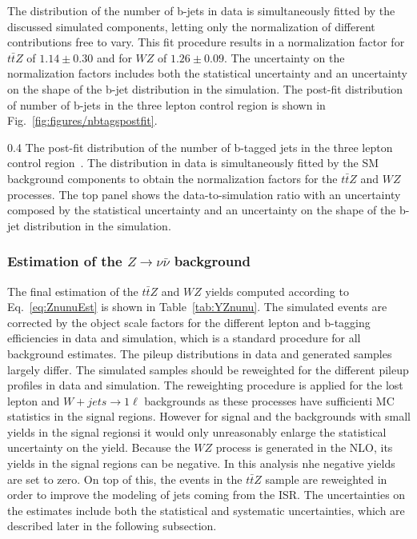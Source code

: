 The distribution of the number of b-jets in data is simultaneously fitted by the discussed simulated components, letting only the normalization of different contributions free to vary. This fit procedure results in a normalization factor for $t\bar{t}Z$ of $1.14 \pm 0.30$ and for $WZ$ of $1.26 \pm 0.09$. The uncertainty on the normalization factors includes both the statistical uncertainty and an uncertainty on the shape of the b-jet distribution in the simulation. The post-fit distribution of number of b-jets in the three lepton control region is shown in Fig.~\ref{fig:figures/nbtagspostfit}.

                 {0.4}       %
                 { The post-fit distribution of the number of b-tagged jets in the three lepton control region~\cite{Sirunyan:2017uyt}. The distribution in data is simultaneously fitted by the SM background components to obtain the normalization factors for the $t\bar{t}Z$ and $WZ$ processes. The top panel shows the data-to-simulation ratio with an uncertainty composed by the statistical uncertainty and an uncertainty on the shape of the b-jet distribution in the simulation.  }

\subsubsection{Estimation of the $Z \to \nu \bar{\nu}$ background }

The final estimation of the $t\bar{t}Z$ and $WZ$ yields computed according to Eq.~\ref{eq:ZnunuEst} is shown in Table~\ref{tab:YZnunu}. The simulated events are corrected by the object scale factors for the different lepton and b-tagging efficiencies in data and simulation, which is a standard procedure for all background estimates. The  pileup distributions in data and  generated samples largely differ. The simulated samples should be reweighted for the different pileup profiles in data and simulation. The reweighting procedure is applied for the lost lepton and $W+jets \to 1\ell$ backgrounds as these processes have sufficienti MC statistics in the signal regions. However for signal and the backgrounds with small yields in the signal regionsi it would only unreasonably enlarge the statistical uncertainty on the yield.   Because the $WZ$ process is generated in the NLO, its yields in the signal regions can be negative. In this analysis nhe negative yields are set to zero. On top of this, the events in the $t\bar{t}Z$ sample are reweighted in order to improve the modeling of jets coming from the ISR. The uncertainties on the estimates include both the statistical and systematic uncertainties, which are described later in the following subsection.


